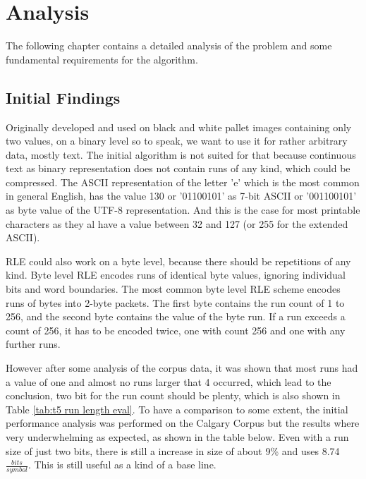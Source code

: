 
\chapter{Analysis}
\label{ch:Analysis}

\par{
The following chapter contains a detailed analysis of the problem and some fundamental requirements for the algorithm. 
}

\section{Initial Findings}
\label{ch:Analysis:sec:Initial Findings}
\par{
 Originally developed and used on black and white pallet images containing only two values, on a binary level so to speak, we want to use it for rather arbitrary data, mostly text. The initial algorithm is not suited for that because continuous text as binary representation does not contain runs of any kind, which could be compressed. The ASCII representation of the letter 'e' which is the most common in general English, has the value 130 or '01100101' as 7-bit ASCII or '001100101' as byte value of the UTF-8 representation. And this is the case for most printable characters as they al have a value between 32 and 127 (or 255 for the extended ASCII).
}

\par{
RLE could also work on a byte level, because there should be repetitions of any kind. Byte level RLE encodes runs of identical byte values, ignoring individual bits and word boundaries. The most common byte level RLE scheme encodes runs of bytes into 2-byte packets. The first byte contains the run count of 1 to 256, and the second byte contains the value of the byte run. If a run exceeds a count of 256, it has to be encoded twice, one with count 256 and one with any further runs.
}

\par{
 However after some analysis of the corpus data, it was shown that most runs had a value of one and almost no runs larger that 4 occurred, which lead to the conclusion, two bit for the run count should be plenty, which is also shown in Table \ref{tab:t5 run length eval}.
To have a comparison to some extent, the initial performance analysis was performed on the Calgary Corpus but the results where very underwhelming as expected, as shown in the table below. Even with a run size of just two bits, there is still a increase in size of about 9\% and uses 8.74 $\frac{bits}{symbol}$. This is still useful as a kind of a base line.
}

